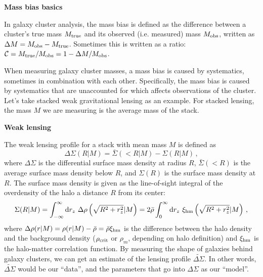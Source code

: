 \documentclass[12pt]{article}
\newcommand{\wds}{\widetilde{\Delta\Sigma}}
\newcommand{\ds}{\Delta\Sigma}
\begin{document}
\noindent
{\bf Mass bias basics}

In galaxy cluster analysis, the mass bias is defined as the difference between a cluster's true mass $M_{\rm true}$ and its observed (i.e. measured) mass $M_{\rm obs}$, written as $\Delta M = M_{\rm obs}-M_{\rm true}$. Sometimes this is written as a ratio: $\mathcal{C} = M_{\rm true}/M_{\rm obs} = 1-\Delta M/M_{\rm obs}$.

When measuring galaxy cluster masses, a mass bias is caused by systematics, sometimes in combination with each other. Specifically, the mass bias is caused by systematics that are unaccounted for which affects observations of the cluster. Let's take stacked weak gravitational lensing as an example. For stacked lensing, the mass $M$ we are measuring is the average mass of the stack.

\vspace{12pt}
\noindent
{\bf Weak lensing}

The weak lensing profile for a stack with mean mass $M$ is defined as 
%
\begin{equation}
	\label{eq:deltasigma_def}
	\Delta\Sigma(R|M) = \bar{\Sigma}(<R|M) - \Sigma(R|M)\,,
\end{equation}
%
where $\Delta\Sigma$ is the differential surface mass density at radius $R$, $\bar{\Sigma}(<R)$ is the average surface mass density below $R$, and $\Sigma(R)$ is the surface mass density at $R$. The surface mass density is given as the line-of-sight integral of the overdensity of the halo a distance $R$ from its center:
%
\begin{equation}
	\label{eq:sigma_def}
	\Sigma(R|M) = \int_{-\infty}^{\infty} {\rm d}r_z\ \Delta\rho\left(\sqrt{R^2+r_z^2}|M\right) = 2\bar{\rho}\int_0^\infty {\rm d}r_z\ \xi_{\rm hm}\left(\sqrt{R^2+r_z^2}|M\right)\,,
\end{equation}
%
where $\Delta\rho(r|M) = \rho(r|M) - \bar{\rho} = \bar{\rho}\xi_{\rm hm}$ is the difference between the halo density and the background density ($\rho_{\rm crit}$ or $\rho_{m}$, depending on halo definition) and $\xi_{\rm hm}$ is the halo-matter correlation function. By measuring the shape of galaxies behind galaxy clusters, we can get an estimate of the lensing profile $\wds$. In other words, $\wds$ would be our ``data'', and the parameters that go into $\ds$ as our ``model''.
\end{document}
